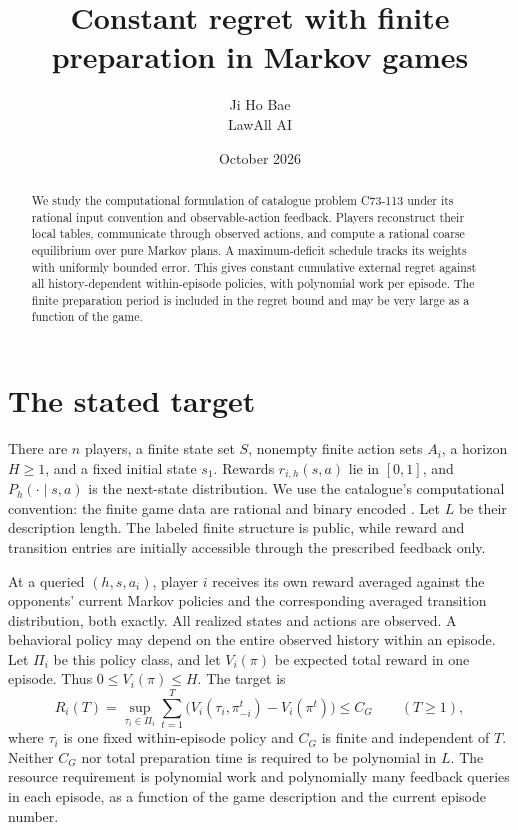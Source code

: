 \documentclass[11pt]{article}
\title{Constant regret with finite preparation in Markov games}
\author{Ji Ho Bae\\\small LawAll AI}
\date{October 2026}
\begin{document}
\maketitle
\begin{abstract}
We study the computational formulation of catalogue problem C73-113
under its rational input convention and observable-action feedback.
Players reconstruct their local tables, communicate through observed
actions, and compute a rational coarse equilibrium over pure Markov
plans. A maximum-deficit schedule tracks its weights with uniformly
bounded error. This gives constant cumulative external regret against
all history-dependent within-episode policies, with polynomial work per
episode. The finite preparation period is included in the regret bound
and may be very large as a function of the game.
\end{abstract}

\section{The stated target}
There are $n$ players, a finite state set $S$, nonempty finite action
sets $A_i$, a horizon $H\geq1$, and a fixed initial state $s_1$.
Rewards $r_{i,h}(s,a)$ lie in $[0,1]$, and $P_h(\cdot\mid s,a)$ is the
next-state distribution. We use the catalogue's computational convention:
the finite game data are rational and binary encoded
\cite[Common conventions, Computational representations]{catalogue}.
Let $L$ be their description length. The labeled finite structure is
public, while reward and transition entries are initially accessible
through the prescribed feedback only.

At a queried $(h,s,a_i)$, player $i$ receives its own reward averaged
against the opponents' current Markov policies and the corresponding
averaged transition distribution, both exactly. All realized states and actions are observed. A behavioral
policy may depend on the entire observed history within an episode.
Let $\Pi_i$ be this policy class, and let $V_i(\pi)$ be expected total
reward in one episode. Thus $0\leq V_i(\pi)\leq H$. The target is
\[
 R_i(T)=\sup_{\tau_i\in\Pi_i}\sum_{t=1}^T
       \bigl(V_i(\tau_i,\pi^t_{-i})-V_i(\pi^t)\bigr)\leq C_G
 \qquad(T\geq1),
\]
where $\tau_i$ is one fixed within-episode policy and $C_G$ is finite
and independent of $T$. Neither $C_G$ nor total preparation time is
required to be polynomial in $L$. The resource requirement is polynomial
work and polynomially many feedback queries in each episode, as a
function of the game description and the current episode number.
\end{document}
